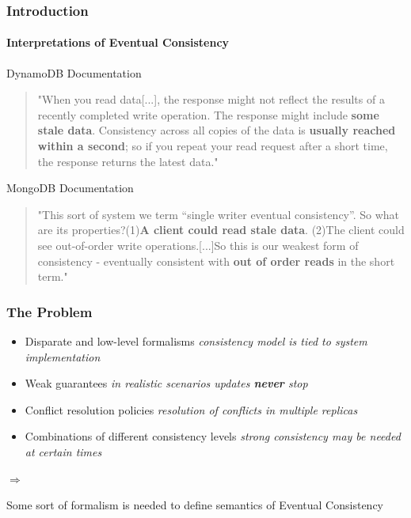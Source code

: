 \documentclass[11pt]{beamer}
\begin{document}
\begin{frame}
\frametitle{Introduction}
\framesubtitle{Interpretations of Eventual Consistency}
\begin{footnotesize}
\begin{block}{DynamoDB Documentation}
\begin{quotation}
"When you read data[...], the response might not reflect the results of a recently completed write operation. The response might include \textbf{some stale data}. Consistency across all copies of the data is \textbf{usually reached within a second}; so if you repeat your read request after a short time, the response returns the latest data."
\end{quotation}
\end{block}

\begin{block}{MongoDB Documentation}
\begin{quotation}
"This sort of system we term “single writer eventual consistency”. So what are its properties?\linebreak (1)\textbf{A client could read stale data}. \linebreak(2)The client could see out-of-order write operations.[...]\linebreak So this is our weakest form of consistency - eventually consistent with \textbf{out of order reads} in the short term."
\end{quotation}
\end{block}
\end{footnotesize}
\end{frame}

\begin{frame}
\frametitle{The Problem}
\begin{itemize}
\item Disparate and low-level formalisms\linebreak 
\textit{consistency model is tied to system implementation}
\item Weak guarantees\linebreak 
\textit{in realistic scenarios updates \textbf{never} stop}
\item Conflict resolution policies\linebreak 
\textit{resolution of conflicts in multiple replicas}
\item Combinations of different consistency levels\linebreak 
\textit{strong consistency may be needed at certain times} 
\end{itemize}
\begin{large}
\ensuremath{\Rightarrow}
\end{large}
Some sort of formalism is needed to define semantics of Eventual Consistency
\end{frame}
\end{document}
